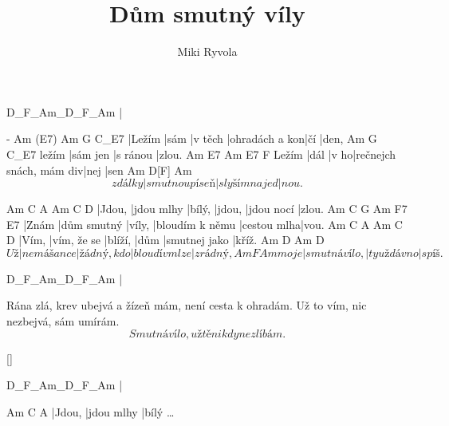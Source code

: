 \documentclass{song}
\title{Dům smutný víly}
\author{Miki Ryvola}
\begin{document}
\strophe
D_F_Am_D_F_Am
|
\endstrophe

\strophe
-      Am   (E7)    Am             G   C_E7
|Ležím |sám |v těch |ohradách a kon|čí |den,
      Am       G        C_E7
ležím |sám jen |s ránou |zlou.
      Am   E7   Am                      E7   F
Ležím |dál |v ho|rečnejch snách, mám div|nej |sen
        Am             D[F]         Am
\[ z dálky |smutnou píseň |slyším najed|nou. \]
\endstrophe

Am     C          A      Am     C          D
|Jdou, |jdou mlhy |bílý, |jdou, |jdou nocí |zlou.
Am    C           G      Am              F7          E7
|Znám |dům smutný |víly, |bloudím k němu |cestou mlha|vou.
Am    C           A       Am   C             D
|Vím, |vím, že se |blíží, |dům |smutnej jako |kříž.
      Am          D           Am             D
\[ Už |nemá šance |žádný, kdo |bloudí v mlze |zrádný,
     Am            F            Am
moje |smutná vílo, |ty už dávno |spíš. \]
\endstrophe

\strophe
D_F_Am_D_F_Am
|
\endstrophe

\strophe*
Rána zlá, krev ubejvá a žízeň mám,
není cesta k ohradám.
Už to vím, nic nezbejvá, sám umírám.
\[ Smutná vílo, už tě nikdy nezlíbám. \]
\endstrophe

\ref{}

\strophe
D_F_Am_D_F_Am
|
\endstrophe

\strophe
Am     C          A
|Jdou, |jdou mlhy |bílý \ldots{}
\endstrophe
\end{document}
